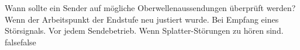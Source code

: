     {Wann sollte ein Sender auf mögliche Oberwellenaussendungen überprüft werden?}
    {Wenn der Arbeitspunkt der Endstufe neu justiert wurde.
}
    {Bei Empfang eines Störsignals.}
    {Vor jedem Sendebetrieb.
}
    {Wenn Splatter-Störungen zu hören sind.}
    {false}{false}